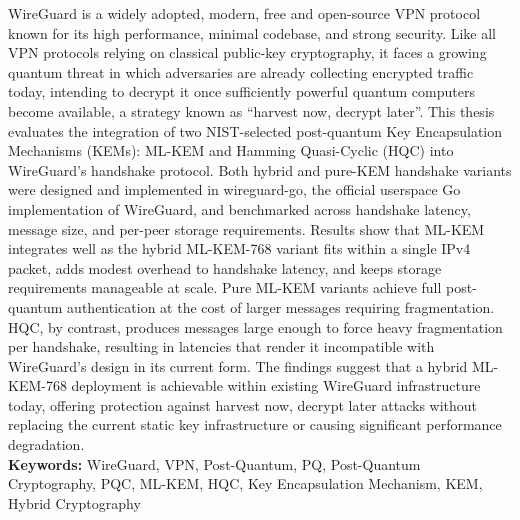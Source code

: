\noindent WireGuard is a widely adopted, modern, free and open-source VPN protocol known for its high performance, minimal codebase, and strong security. Like all VPN protocols relying on classical public-key cryptography, it faces a growing quantum threat in which adversaries are already collecting encrypted traffic today, intending to decrypt it once sufficiently powerful quantum computers become available, a strategy known as ``harvest now, decrypt later''. This thesis evaluates the integration of two NIST-selected post-quantum Key Encapsulation Mechanisms (KEMs): ML-KEM and Hamming Quasi-Cyclic (HQC) into WireGuard's handshake protocol. Both hybrid and pure-KEM handshake variants were designed and implemented in wireguard-go, the official userspace Go implementation of WireGuard, and benchmarked across handshake latency, message size, and per-peer storage requirements. Results show that ML-KEM integrates well as the hybrid ML-KEM-768 variant fits within a single IPv4 packet, adds modest overhead to handshake latency, and keeps storage requirements manageable at scale. Pure ML-KEM variants achieve full post-quantum authentication at the cost of larger messages requiring fragmentation. HQC, by contrast, produces messages large enough to force heavy fragmentation per handshake, resulting in latencies that render it incompatible with WireGuard's design in its current form. The findings suggest that a hybrid ML-KEM-768 deployment is achievable within existing WireGuard infrastructure today, offering protection against harvest now, decrypt later attacks without replacing the current static key infrastructure or causing significant performance degradation. \\

\noindent \textbf{Keywords:} WireGuard, VPN, Post-Quantum, PQ, Post-Quantum Cryptography, PQC, ML-KEM, HQC, Key Encapsulation Mechanism, KEM, Hybrid Cryptography
